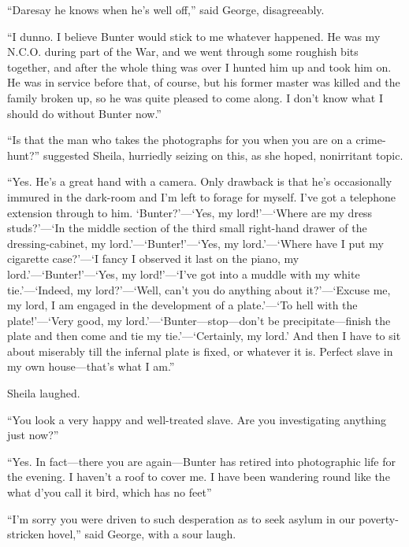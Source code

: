 \enquote{Daresay he knows when he's well off,} said George, disagreeably.

\enquote{I dunno. I believe Bunter would stick to me whatever happened. He was my N.C.O. during part of the War, and we went through some roughish bits together, and after the whole thing was over I hunted him up and took him on. He was in service before that, of course, but his former master was killed and the family broken up, so he was quite pleased to come along. I don't know what I should do without Bunter now.}

\enquote{Is that the man who takes the photographs for you when you are on a crime-hunt?} suggested Sheila, hurriedly seizing on this, as she hoped, nonirritant topic.

\enquote{Yes. He's a great hand with a camera. Only drawback is that he's occasionally immured in the dark-room and I'm left to forage for myself. I've got a telephone extension through to him. \enquote{Bunter?}---\enquote{Yes, my lord!}---\enquote{Where are my dress studs?}---\enquote{In the middle section of the third small right-hand drawer of the dressing-cabinet, my lord.}---\enquote{Bunter!}---\enquote{Yes, my lord.}---\enquote{Where have I put my cigarette case?}---\enquote{I fancy I observed it last on the piano, my lord.}---\enquote{Bunter!}---\enquote{Yes, my lord!}---\enquote{I've got into a muddle with my white tie.}---\enquote{Indeed, my lord?}---\enquote{Well, can't you do anything about it?}---\enquote{Excuse me, my lord, I am engaged in the development of a plate.}---\enquote{To hell with the plate!}---\enquote{Very good, my lord.}---\enquote{Bunter\allowbreak---\allowbreak stop---don't be precipitate\allowbreak---\allowbreak finish the plate and then come and tie my tie.}---\enquote{Certainly, my lord.} And then I have to sit about miserably till the infernal plate is fixed, or whatever it is. Perfect slave in my own house\allowbreak---\allowbreak that's what I am.}

Sheila laughed.

\enquote{You look a very happy and well-treated slave. Are you investigating anything just now?}

\enquote{Yes. In fact\allowbreak---\allowbreak there you are again\allowbreak---\allowbreak Bunter has retired into photographic life for the evening. I haven't a roof to cover me. I have been wandering round like the what d'you call it bird, which has no feet\longdash}

\enquote{I'm sorry you were driven to such desperation as to seek asylum in our poverty-stricken hovel,} said George, with a sour laugh.

